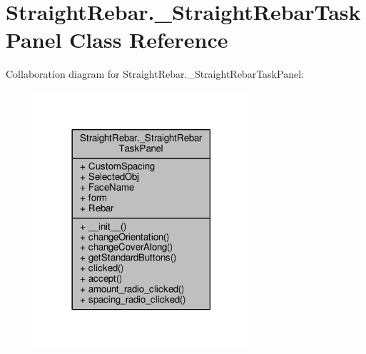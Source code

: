 \hypertarget{classStraightRebar_1_1__StraightRebarTaskPanel}{}\section{Straight\+Rebar.\+\_\+\+Straight\+Rebar\+Task\+Panel Class Reference}
\label{classStraightRebar_1_1__StraightRebarTaskPanel}


Collaboration diagram for Straight\+Rebar.\+\_\+\+Straight\+Rebar\+Task\+Panel\+:\nopagebreak
\begin{figure}[H]
\begin{center}
\leavevmode
\includegraphics[width=225pt]{classStraightRebar_1_1__StraightRebarTaskPanel__coll__graph}
\end{center}
\end{figure}
